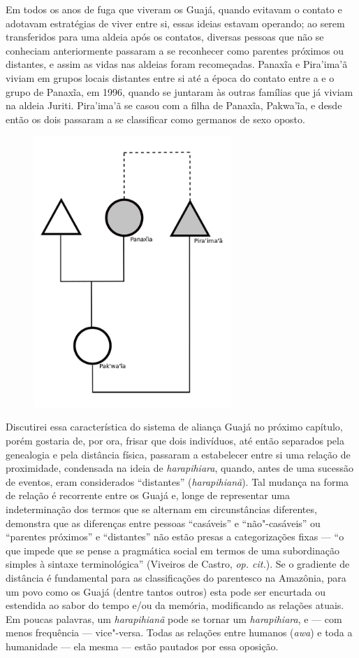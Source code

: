 Em todos os anos de fuga que viveram os Guajá, quando evitavam o contato
e adotavam estratégias de viver entre si, essas ideias estavam operando;
ao serem transferidos para uma aldeia após os contatos, diversas pessoas
que não se conheciam anteriormente passaram a se reconhecer como
parentes próximos ou distantes, e assim as vidas nas aldeias foram
recomeçadas. Panaxĩa e Pira'ima'ã viviam em grupos locais distantes
entre si até a época do contato entre a  e o grupo de Panaxĩa, em
1996, quando se juntaram às outras famílias que já viviam na aldeia
Juriti. Pira'ima'ã se casou com a filha de Panaxĩa, Pakwa'ĩa, e desde
então os dois passaram a se classificar como germanos de sexo oposto.

\begin{figure}[H]
\centering
  \includegraphics[width=75mm]{./imgs/Figura_5_crop}
\end{figure}

Discutirei essa característica do sistema de aliança Guajá no próximo
capítulo, porém gostaria de, por ora, frisar que dois indivíduos, até
então separados pela genealogia e pela distância física, passaram a
estabelecer entre si uma relação de proximidade, condensada na ideia de
\emph{harapihiara}, quando, antes de uma sucessão de eventos, eram
considerados ``distantes'' (\emph{harapihianã}). Tal mudança na forma de
relação é recorrente entre os Guajá e, longe de representar uma
indeterminação dos termos que se alternam em circunstâncias diferentes,
demonstra que as diferenças entre pessoas ``casáveis'' e
``não"-casáveis'' ou ``parentes próximos'' e ``distantes'' não estão
presas a categorizações fixas --- ``o que impede que se pense a pragmática
social em termos de uma subordinação simples à sintaxe terminológica''
(Viveiros de Castro, \emph{op. cit.}). Se o gradiente de distância é
fundamental para as classificações do parentesco na Amazônia, para um
povo como os Guajá (dentre tantos outros) esta pode ser encurtada ou
estendida ao sabor do tempo e/ou da memória, modificando as relações
atuais. Em poucas palavras, um \emph{harapihianã} pode se tornar um
\emph{harapihiara}, e --- com menos frequência --- vice"-versa. Todas as
relações entre humanos (\emph{awa}) e toda a humanidade --- ela mesma ---
estão pautados por essa oposição.

